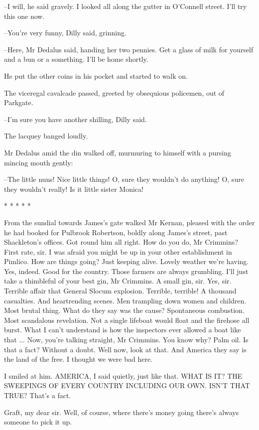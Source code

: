 --I will,
he said gravely.
I looked all along the gutter in O'Connell
street.
I'll try this one now.

--You're very funny,
Dilly said, grinning.

--Here,
Mr Dedalus said,
handing her two pennies.
Get a glass of milk for
yourself
and a bun or a something.
I'll be home shortly.

He put the other coins in his pocket and started to walk on.

The viceregal cavalcade passed,
greeted by obsequious policemen,
out of Parkgate.%

--I'm sure you have another shilling,
Dilly said.

The lacquey banged loudly.

Mr Dedalus amid the din walked off,
murmuring to himself with a
pursing mincing mouth gently:

--The little nuns!
Nice little things!
O, sure they wouldn't do anything!
O, sure they wouldn't really!
Is it little sister Monica!


    * * * * *


From the sundial
towards James's gate
walked Mr Kernan,
pleased with the order he had booked for Pulbrook Robertson,
boldly along James's street,
past Shackleton's offices.
Got round him all right.
How do you do, Mr Crimmins?
First rate, sir.
I was afraid you might be up in your other establishment in Pimlico.
How are things going?
Just keeping alive.
Lovely weather we're having.
Yes, indeed.
Good for the country.
Those farmers are always grumbling.
I'll just take a thimbleful of your best gin, Mr Crimmins.
A small gin, sir.
Yes, sir.
Terrible affair that
General Slocum explosion.
Terrible, terrible!
A thousand casualties.
And heartrending scenes.
Men trampling down women and children.
Most brutal thing.
What do they say was the cause?
Spontaneous combustion.
Most scandalous revelation.
Not a single lifeboat would float and the firehose all burst.
What I can't understand
is how the inspectors ever allowed a boat like that ...
Now, you're talking straight, Mr Crimmins.
You know why?
Palm oil.
Is that a fact?
Without a doubt.
Well now, look at that.
And America they say is the land of the free.
I thought we were bad here.

I smiled at him.
AMERICA,
I said quietly,
just like that.
WHAT IS IT?
THE
SWEEPINGS OF EVERY COUNTRY INCLUDING OUR OWN.
ISN'T THAT TRUE?
That's a
fact.

Graft,
my dear sir.
Well, of course, where there's money going
there's
always someone to pick it up.

